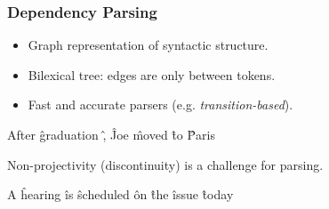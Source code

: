 \documentclass[t]{beamer}
\begin{document}
\begin{frame}
\frametitle{Dependency Parsing}
\begin{itemize}
	\item Graph representation of syntactic structure.
	\item Bilexical tree: edges are only between tokens.
	\item Fast and accurate parsers (e.g. \textit{transition-based}).
\end{itemize}
\vfill
\begin{adjustbox}{frame,center}
\begin{dependency}
	\begin{deptext}[column sep=1.5em,ampersand replacement=\^,font=\rmfamily]
	After \^ graduation \^ , \^ Joe \^ moved \^ to \^ Paris \\
	\end{deptext}
\end{dependency}
\end{adjustbox}

\pause
Non-projectivity (discontinuity) is a challenge for parsing.
\begin{adjustbox}{scale=.8,frame,center}
\begin{dependency}
	\begin{deptext}[column sep=1.2em,ampersand replacement=\^,font=\rmfamily]
	A \^ hearing \^ is \^ scheduled \^ on \^ the \^ issue \^ today \\
	\end{deptext}
\end{dependency}
\end{adjustbox}
\end{frame}
\end{document}

